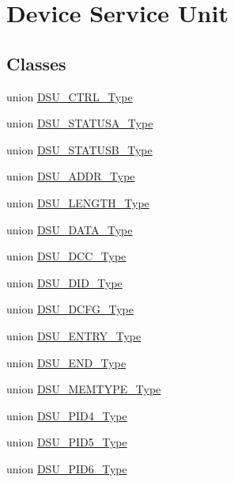 \hypertarget{group___s_a_m_l21___d_s_u}{}\section{Device Service Unit}
\label{group___s_a_m_l21___d_s_u}
\subsection*{Classes}
\begin{DoxyCompactItemize}
\item 
union \hyperlink{union_d_s_u___c_t_r_l___type}{D\+S\+U\+\_\+\+C\+T\+R\+L\+\_\+\+Type}
\item 
union \hyperlink{union_d_s_u___s_t_a_t_u_s_a___type}{D\+S\+U\+\_\+\+S\+T\+A\+T\+U\+S\+A\+\_\+\+Type}
\item 
union \hyperlink{union_d_s_u___s_t_a_t_u_s_b___type}{D\+S\+U\+\_\+\+S\+T\+A\+T\+U\+S\+B\+\_\+\+Type}
\item 
union \hyperlink{union_d_s_u___a_d_d_r___type}{D\+S\+U\+\_\+\+A\+D\+D\+R\+\_\+\+Type}
\item 
union \hyperlink{union_d_s_u___l_e_n_g_t_h___type}{D\+S\+U\+\_\+\+L\+E\+N\+G\+T\+H\+\_\+\+Type}
\item 
union \hyperlink{union_d_s_u___d_a_t_a___type}{D\+S\+U\+\_\+\+D\+A\+T\+A\+\_\+\+Type}
\item 
union \hyperlink{union_d_s_u___d_c_c___type}{D\+S\+U\+\_\+\+D\+C\+C\+\_\+\+Type}
\item 
union \hyperlink{union_d_s_u___d_i_d___type}{D\+S\+U\+\_\+\+D\+I\+D\+\_\+\+Type}
\item 
union \hyperlink{union_d_s_u___d_c_f_g___type}{D\+S\+U\+\_\+\+D\+C\+F\+G\+\_\+\+Type}
\item 
union \hyperlink{union_d_s_u___e_n_t_r_y___type}{D\+S\+U\+\_\+\+E\+N\+T\+R\+Y\+\_\+\+Type}
\item 
union \hyperlink{union_d_s_u___e_n_d___type}{D\+S\+U\+\_\+\+E\+N\+D\+\_\+\+Type}
\item 
union \hyperlink{union_d_s_u___m_e_m_t_y_p_e___type}{D\+S\+U\+\_\+\+M\+E\+M\+T\+Y\+P\+E\+\_\+\+Type}
\item 
union \hyperlink{union_d_s_u___p_i_d4___type}{D\+S\+U\+\_\+\+P\+I\+D4\+\_\+\+Type}
\item 
union \hyperlink{union_d_s_u___p_i_d5___type}{D\+S\+U\+\_\+\+P\+I\+D5\+\_\+\+Type}
\item 
union \hyperlink{union_d_s_u___p_i_d6___type}{D\+S\+U\+\_\+\+P\+I\+D6\+\_\+\+Type}
\item 

\end{DoxyCompactItemize}

